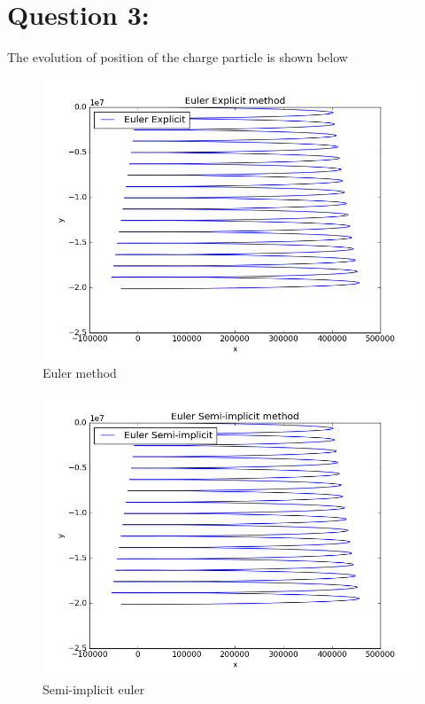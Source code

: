 \documentclass[11pt, a4paper]{article}
\begin{document}
\section{Question 3:}
The evolution of position of the charge particle is shown below
\begin{figure}[H]
 \centering
 \includegraphics[scale = 0.5]{Euler_exp_2.png}
 \caption{Euler method}
\end{figure}
\begin{figure}[H]
 \centering
 \includegraphics[scale = 0.5]{Euler_sem_2.png}
 \caption{Semi-implicit euler}
\end{figure}
\end{document}
